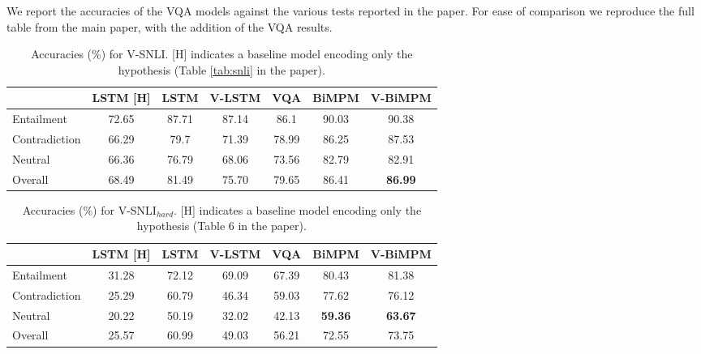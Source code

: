 \documentclass[11pt]{article}
\begin{document}
We report the accuracies of the VQA models against the various tests
reported in the paper. For ease of comparison we reproduce the full table from the main paper,
with the addition of the  VQA results.

\begin{table}[!ht]
	\begin{center}
		\begin{tabular}{|l|c||ccccc|}
			\hline
			& LSTM [H] & LSTM & V-LSTM &   VQA & BiMPM &V-BiMPM   \\\hline
			Entailment &  72.65 &87.71 & 87.14 & 86.1 & 90.03 & 90.38    \\
			Contradiction &  66.29 &79.7&  71.39   & 78.99& 86.25 &  87.53  \\
			Neutral & 66.36 & 76.79 &  68.06 &  73.56 & 82.79 & 82.91  \\\hline
			Overall & 68.49 & 81.49 &  75.70 &  79.65  & 86.41 & \textbf{86.99} \\
			\hline
		\end{tabular}
	\end{center}
	\caption{Accuracies (\%) for V-SNLI. [H] indicates a baseline model encoding only the hypothesis (Table \ref{tab:snli} in the paper).} \label{tab:snli-supp}
\end{table}



\begin{table}[!ht]
	\begin{center}
		\begin{tabular}{|l|c||ccccc|}
			\hline
			& LSTM [H] & LSTM  & V-LSTM  & VQA & BiMPM &V-BiMPM  \\\hline
			Entailment &  31.28 & 72.12&  69.09  & 67.39&   80.43 & 81.38 \\
			Contradiction & 25.29 & 60.79 &  46.34    & 59.03 & 77.62 & 76.12 \\
			Neutral & 20.22 & 50.19 &  32.02 &  42.13  & \textbf{59.36} & \textbf{63.67}\\\hline
			Overall & 25.57 & 60.99 &   49.03 &  56.21  & 72.55 & 73.75 \\
			\hline
		\end{tabular}
	\end{center}
	\caption{Accuracies (\%) for V-SNLI$_{hard}$. [H] indicates a baseline model encoding only the hypothesis (Table 6 in the paper).} \label{tab:hard-supp}
\end{table}
\end{document}

